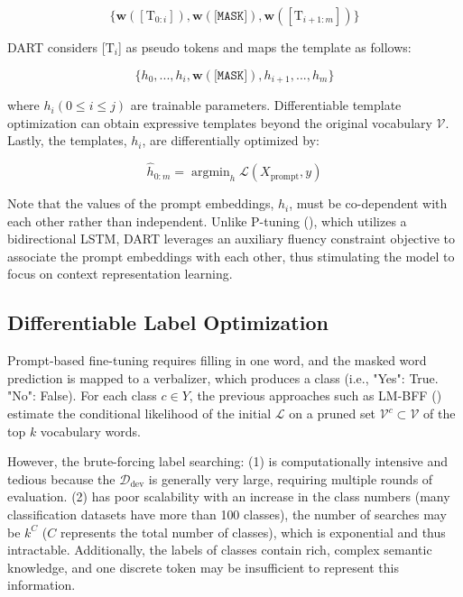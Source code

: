 \documentclass{article} \usepackage{iclr2022_conference,times}
\newcommand{\ddev}{\mathcal{D}_{\text{dev}}}
\newcommand{\xprompt}{{X}_{\mathrm{prompt}}}
\newcommand{\labelset}{Y}
\newcommand{\lm}{\mathcal{L}}
\newcommand{\mask}{\texttt{[MASK]}}
\begin{document}
\begin{equation}
    \{\mathbf{w}([\mathrm{T}_{0:i}]),\mathbf{w}(\mathbf{\mask}),\mathbf{w}([\mathrm{T}_{i+1:m}])\}
\end{equation}

DART considers [$\mathrm{T}_i$] as pseudo tokens and maps the template as follows:

\begin{equation}
    \{h_0,...,h_i,\mathbf{w}(\mathbf{\mask}),h_{i+1},...,h_m\}
\end{equation}

where $h_i (0\leq i \leq j)$ are trainable parameters. 
Differentiable template optimization can obtain expressive templates beyond the original vocabulary $\mathcal{V}$.
Lastly, the templates, $h_i$, are differentially optimized by:

\begin{equation}
    \hat{h}_{0:m}=\mathop{\arg\min}_h \lm(\xprompt, y)
\end{equation}

Note that the values of the prompt embeddings, $h_i$, must be co-dependent with each other rather than independent.
Unlike P-tuning (\cite{DBLP:journals/corr/abs-2103-10385}), which utilizes a bidirectional LSTM, DART leverages an auxiliary fluency constraint objective to associate the prompt embeddings with each other, thus stimulating the model to focus on context representation learning. 

\subsection{Differentiable Label Optimization}
\label{optsec2}

Prompt-based fine-tuning requires filling in one word, and the masked word prediction is mapped to a verbalizer, which produces a class (i.e., "Yes": True. "No": False).
For each class $c \in \labelset$, the previous approaches such as LM-BFF (\cite{DBLP:journals/corr/abs-2012-15723}) estimate the conditional likelihood of the initial  $\lm$ on a pruned set  $\mathcal{V}^c \subset \mathcal{V}$ of the top $k$ vocabulary words.

However, the brute-forcing label searching:
(1) is computationally intensive and tedious because the $\ddev$ is generally very large, requiring multiple rounds of evaluation.
(2) has poor scalability with an increase in the class numbers (many classification datasets have more than 100 classes), the number of searches may be $k^{C}$ ($C$ represents the total number of classes), which is exponential and thus intractable.
Additionally, the labels of classes contain rich, complex semantic knowledge, and one discrete token may be insufficient to represent this information.
\end{document}

